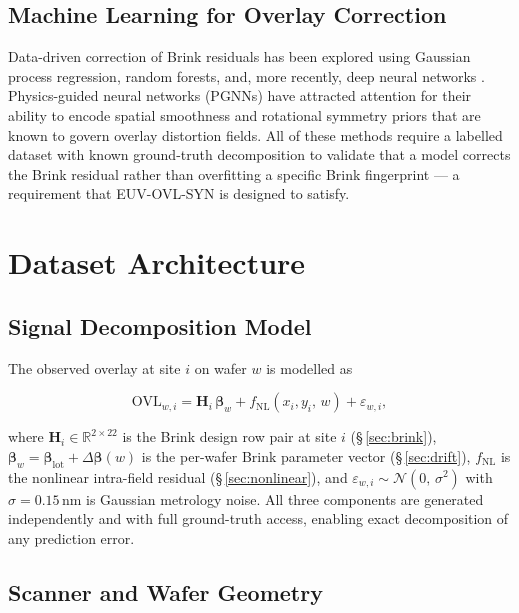 \documentclass[10pt,conference]{IEEEtran}
\begin{document}
\subsection{Machine Learning for Overlay Correction}

Data-driven correction of Brink residuals has been explored using Gaussian
process regression, random forests, and, more recently, deep neural networks
\cite{smith2018, abbe2019, kim2020}.  Physics-guided neural networks
(PGNNs) \cite{raissi2019} have attracted attention for their ability to
encode spatial smoothness and rotational symmetry priors that are known to
govern overlay distortion fields.  All of these methods require a labelled
dataset with known ground-truth decomposition to validate that a model
corrects the Brink residual rather than overfitting a specific Brink fingerprint
— a requirement that \textsc{EUV-OVL-SYN} is designed to satisfy.

\section{Dataset Architecture}

\subsection{Signal Decomposition Model}

The observed overlay at site $i$ on wafer $w$ is modelled as

\begin{equation}
  \mathrm{OVL}_{w,i}
  = \mathbf{H}_i\,\bm{\beta}_w
  + f_{\mathrm{NL}}(x_i, y_i,\, w)
  + \varepsilon_{w,i},
  \label{eq:signal}
\end{equation}

\noindent where $\mathbf{H}_i \in \mathbb{R}^{2\times 22}$ is the Brink
design row pair at site $i$ (§\,\ref{sec:brink}),
$\bm{\beta}_w = \bm{\beta}_{\text{lot}} + \Delta\bm{\beta}(w)$ is the
per-wafer Brink parameter vector (§\,\ref{sec:drift}),
$f_{\mathrm{NL}}$ is the nonlinear intra-field residual
(§\,\ref{sec:nonlinear}), and
$\varepsilon_{w,i} \sim \mathcal{N}(0,\,\sigma^2)$ with $\sigma\!=\!0.15$\,nm
is Gaussian metrology noise.
All three components are generated independently and with full ground-truth
access, enabling exact decomposition of any prediction error.

\subsection{Scanner and Wafer Geometry}
\end{document}
